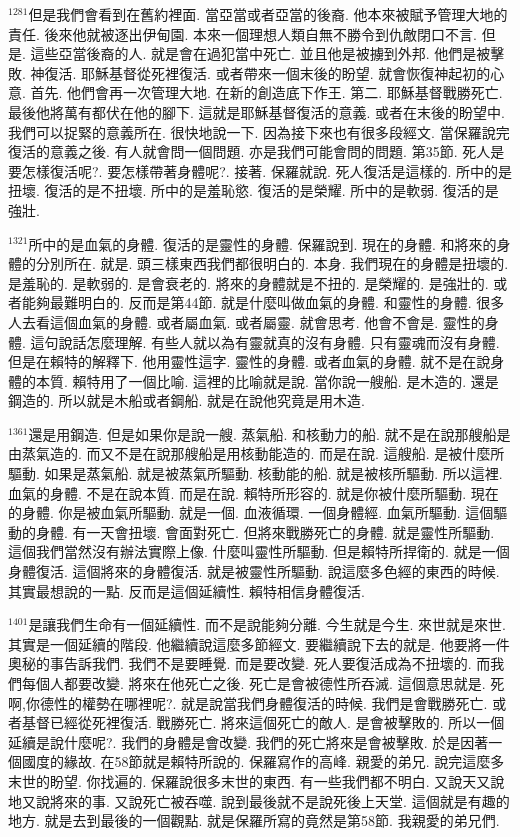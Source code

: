 \documentclass{book}
\begin{document}
$^{1281}$但是我們會看到在舊約裡面.
當亞當或者亞當的後裔.
他本來被賦予管理大地的責任.
後來他就被逐出伊甸園.
本來一個理想人類自無不勝令到仇敵閉口不言.
但是.
這些亞當後裔的人.
就是會在過犯當中死亡.
並且他是被擄到外邦.
他們是被擊敗.
神復活.
耶穌基督從死裡復活.
或者帶來一個末後的盼望.
就會恢復神起初的心意.
首先.
他們會再一次管理大地.
在新的創造底下作王.
第二.
耶穌基督戰勝死亡.
最後他將萬有都伏在他的腳下.
這就是耶穌基督復活的意義.
或者在末後的盼望中.
我們可以捉緊的意義所在.
很快地說一下.
因為接下來也有很多段經文.
當保羅說完復活的意義之後.
有人就會問一個問題.
亦是我們可能會問的問題.
第35節.
死人是要怎樣復活呢?.
要怎樣帶著身體呢?.
接著.
保羅就說.
死人復活是這樣的.
所中的是扭壞.
復活的是不扭壞.
所中的是羞恥慾.
復活的是榮耀.
所中的是軟弱.
復活的是強壯.

$^{1321}$所中的是血氣的身體.
復活的是靈性的身體.
保羅說到.
現在的身體.
和將來的身體的分別所在.
就是.
頭三樣東西我們都很明白的.
本身.
我們現在的身體是扭壞的.
是羞恥的.
是軟弱的.
是會衰老的.
將來的身體就是不扭的.
是榮耀的.
是強壯的.
或者能夠最難明白的.
反而是第44節.
就是什麼叫做血氣的身體.
和靈性的身體.
很多人去看這個血氣的身體.
或者屬血氣.
或者屬靈.
就會思考.
他會不會是.
靈性的身體.
這句說話怎麼理解.
有些人就以為有靈就真的沒有身體.
只有靈魂而沒有身體.
但是在賴特的解釋下.
他用靈性這字.
靈性的身體.
或者血氣的身體.
就不是在說身體的本質.
賴特用了一個比喻.
這裡的比喻就是說.
當你說一艘船.
是木造的.
還是鋼造的.
所以就是木船或者鋼船.
就是在說他究竟是用木造.

$^{1361}$還是用鋼造.
但是如果你是說一艘.
蒸氣船.
和核動力的船.
就不是在說那艘船是由蒸氣造的.
而又不是在說那艘船是用核動能造的.
而是在說.
這艘船.
是被什麼所驅動.
如果是蒸氣船.
就是被蒸氣所驅動.
核動能的船.
就是被核所驅動.
所以這裡.
血氣的身體.
不是在說本質.
而是在說.
賴特所形容的.
就是你被什麼所驅動.
現在的身體.
你是被血氣所驅動.
就是一個.
血液循環.
一個身體經.
血氣所驅動.
這個驅動的身體.
有一天會扭壞.
會面對死亡.
但將來戰勝死亡的身體.
就是靈性所驅動.
這個我們當然沒有辦法實際上像.
什麼叫靈性所驅動.
但是賴特所捍衛的.
就是一個身體復活.
這個將來的身體復活.
就是被靈性所驅動.
說這麼多色經的東西的時候.
其實最想說的一點.
反而是這個延續性.
賴特相信身體復活.

$^{1401}$是讓我們生命有一個延續性.
而不是說能夠分離.
今生就是今生.
來世就是來世.
其實是一個延續的階段.
他繼續說這麼多節經文.
要繼續說下去的就是.
他要將一件奧秘的事告訴我們.
我們不是要睡覺.
而是要改變.
死人要復活成為不扭壞的.
而我們每個人都要改變.
將來在他死亡之後.
死亡是會被德性所吞滅.
這個意思就是.
死啊,你德性的權勢在哪裡呢?.
就是說當我們身體復活的時候.
我們是會戰勝死亡.
或者基督已經從死裡復活.
戰勝死亡.
將來這個死亡的敵人.
是會被擊敗的.
所以一個延續是說什麼呢?.
我們的身體是會改變.
我們的死亡將來是會被擊敗.
於是因著一個國度的緣故.
在58節就是賴特所說的.
保羅寫作的高峰.
親愛的弟兄.
說完這麼多末世的盼望.
你找遍的.
保羅說很多末世的東西.
有一些我們都不明白.
又說天又說地又說將來的事.
又說死亡被吞噬.
說到最後就不是說死後上天堂.
這個就是有趣的地方.
就是去到最後的一個觀點.
就是保羅所寫的竟然是第58節.
我親愛的弟兄們.
\end{document}
